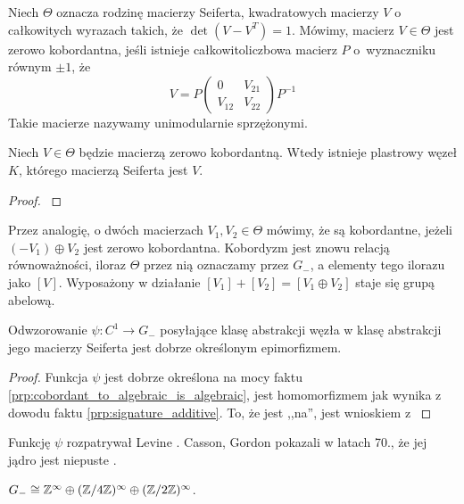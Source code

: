 
Niech $\Theta$ oznacza rodzinę macierzy Seiferta, kwadratowych macierzy $V$ o całkowitych wyrazach takich, że $\det (V - V^T) = 1$.
Mówimy, macierz $V \in \Theta$ jest zerowo kobordantna, jeśli istnieje całkowitoliczbowa macierz $P$ o~wyznaczniku równym $\pm 1$, że
\begin{equation}
    V = P \begin{pmatrix} 0 & V_{21} \\ V_{12} & V_{22} \end{pmatrix} P^{-1}
\end{equation}
Takie macierze nazywamy unimodularnie sprzężonymi.

\begin{proposition}
    Niech $V \in \Theta$ będzie macierzą zerowo kobordantną.
    Wtedy istnieje plastrowy węzeł $K$, którego macierzą Seiferta jest $V$.
\end{proposition}

\begin{proof}
    \cite[proposition 12.2.1]{kawauchi96}
\end{proof}

Przez analogię, o dwóch macierzach $V_1, V_2 \in \Theta$ mówimy, że są kobordantne, jeżeli $(-V_1) \oplus V_2$ jest zerowo kobordantna.
Kobordyzm jest znowu relacją równoważności, iloraz $\Theta$ przez nią oznaczamy przez $G_-$, a elementy tego ilorazu jako $[V]$.
Wyposażony w działanie $[V_1] + [V_2] = [V_1 \oplus V_2]$ staje się grupą abelową.

\begin{proposition}
    Odwzorowanie $\psi \colon C^1 \to G_-$ posyłające klasę abstrakcji węzła w klasę abstrakcji jego macierzy Seiferta jest dobrze określonym epimorfizmem.
\end{proposition}

\begin{proof}
    Funkcja $\psi$ jest dobrze określona na mocy faktu \ref{prp:cobordant_to_algebraic_is_algebraic}, jest homomorfizmem jak wynika z dowodu faktu \ref{prp:signature_additive}.
    To, że jest ,,na'', jest wnioskiem z \cite[s. 62]{kawauchi96}
\end{proof}

Funkcję $\psi$ rozpatrywał Levine \cite{levine69}.
Casson, Gordon pokazali w latach 70., że jej jądro jest niepuste \cite{gordon78}.

\begin{proposition}
    $G_- \cong \mathbb Z^\infty \oplus (\mathbb Z/4\mathbb Z)^\infty \oplus (\mathbb Z/2\mathbb Z)^\infty$.
\end{proposition}

